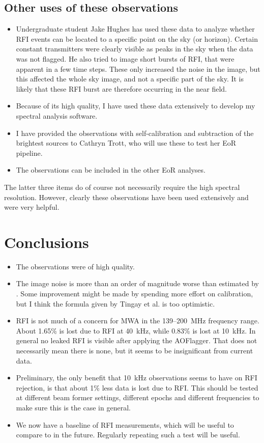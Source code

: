 \documentclass[a4paper,10pt]{article}
\begin{document}
\subsection{Other uses of these observations}
\begin{itemize}
 \item Undergraduate student Jake Hughes has used these data to analyze whether RFI events can be located to a specific point on the sky (or horizon). Certain constant transmitters were clearly visible as peaks in the sky when the data was not flagged. He also tried to image short bursts of RFI, that were apparent in a few time steps. These only increased the noise in the image, but this affected the whole sky image, and not a specific part of the sky. It is likely that these RFI burst are therefore occurring in the near field.
 \item Because of its high quality, I have used these data extensively to develop my spectral analysis software.
 \item I have provided the observations with self-calibration and subtraction of the brightest sources to Cathryn Trott, who will use these to test her EoR pipeline.
 \item The observations can be included in the other EoR analyses.
\end{itemize}
The latter three items do of course not necessarily require the high spectral resolution. However, clearly these observations have been used extensively and were very helpful.

\section{Conclusions}
\begin{itemize}
 \item The observations were of high quality.
 \item The image noise is more than an order of magnitude worse than estimated by \citet{mwa}. Some improvement might be made by spending more effort on calibration, but I think the formula given by Tingay et al. is too optimistic.
 \item RFI is not much of a concern for MWA in the 139--200~MHz frequency range. About 1.65\% is lost due to RFI at 40~kHz, while 0.83\% is lost at 10~kHz. In general no leaked RFI is visible after applying the AOFlagger. That does not necessarily mean there is none, but it seems to be insignificant from current data.
 \item Preliminary, the only benefit that 10~kHz observations seems to have on RFI rejection, is that about 1\% less data is lost due to RFI. This should be tested at different beam former settings, different epochs and different frequencies to make sure this is the case in general.
 \item We now have a baseline of RFI measurements, which will be useful to compare to in the future. Regularly repeating such a test will be useful.
\end{itemize}

\label{lastpage}



\end{document}
